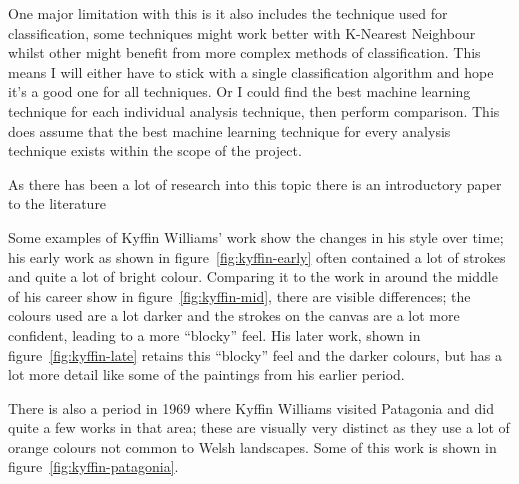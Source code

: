 \documentclass[11pt,fleqn,twoside]{article}
\begin{document}
One major limitation with this is it also includes the technique used for classification, some
techniques might work better with K-Nearest Neighbour whilst other might benefit from more complex
methods of classification. This means I will either have to stick with a single classification
algorithm and hope it's a good one for all techniques. Or I could find the best machine learning
technique for each individual analysis technique, then perform comparison. This does assume that
the best machine learning technique for every analysis technique exists within the scope of the
project.

As there has been a lot of research into this topic there is an introductory paper to the 
literature\cite{Stork2009Computer}

Some examples of Kyffin Williams' work show the changes in his style over time; his early work as
shown in figure~\ref{fig:kyffin-early} often contained a lot of strokes and quite a lot of bright
colour. Comparing it to the work in around the middle of his career show in figure~\ref{fig:kyffin-mid}, there are visible differences;
the colours used are a lot darker and the strokes on the canvas are a lot more confident, leading
to a more ``blocky'' feel. His later work, shown in figure~\ref{fig:kyffin-late} retains this 
``blocky'' feel and the darker colours, but has a lot more detail like some of the paintings from
his earlier period.

There is also a period in 1969 where Kyffin Williams visited Patagonia and did quite a few works
in that area; these are visually very distinct as they use a lot of orange colours not common to
Welsh landscapes. Some of this work is shown in figure~\ref{fig:kyffin-patagonia}.
\end{document}
